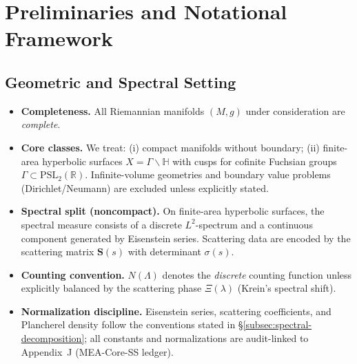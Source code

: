 
\chapter{Preliminaries and Notational Framework}
\label{chap:preliminaries}

\section{Geometric and Spectral Setting}
\label{sec:geom-spectral-setting}

\begin{tcolorbox}[colback=gray!5,colframe=gray!35,title=Scope \& Assumptions (MEA-Core-SS • enforced)]
\begin{itemize}
  \item \textbf{Completeness.} All Riemannian manifolds $(M,g)$ under consideration are \emph{complete}.
  \item \textbf{Core classes.} We treat:
        (i) compact manifolds without boundary;
        (ii) finite-area hyperbolic surfaces $X=\Gamma\backslash\mathbb{H}$ with cusps for cofinite Fuchsian groups $\Gamma\subset \mathrm{PSL}_2(\mathbb{R})$.
        Infinite-volume geometries and boundary value problems (Dirichlet/Neumann) are excluded unless explicitly stated.
  \item \textbf{Spectral split (noncompact).} On finite-area hyperbolic surfaces, the spectral measure consists of a discrete $L^2$-spectrum and a continuous component generated by Eisenstein series. Scattering data are encoded by the scattering matrix $\mathbf{S}(s)$ with determinant $\sigma(s)$.
  \item \textbf{Counting convention.} $N(\Lambda)$ denotes the \emph{discrete} counting function unless explicitly balanced by the scattering phase $\Xi(\lambda)$ (Krein's spectral shift).
  \item \textbf{Normalization discipline.} Eisenstein series, scattering coefficients, and Plancherel density follow the conventions stated in \S\ref{subsec:spectral-decomposition}; all constants and normalizations are audit-linked to Appendix~J (MEA-Core-SS ledger).
\end{itemize}
\end{tcolorbox}


